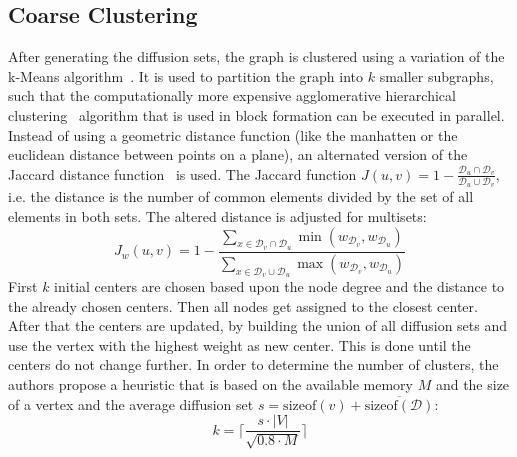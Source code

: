     \subsection{Coarse Clustering}\label{\positionnumber}
    After generating the diffusion sets, the graph is clustered using a variation of the k-Means algorithm~\autocite{lloyd1982least}. 
    It is used to partition the graph into $k$ smaller subgraphs, such that the computationally more expensive agglomerative hierarchical clustering~\autocite{hac} algorithm that is used in block formation can be executed in parallel.
    Instead of using a geometric distance function (like the manhatten or the euclidean distance between points on a plane), an alternated version of the Jaccard distance function~\autocite{jaccard1912distribution} is used. 
    The Jaccard function $J(u, v) = 1 - \frac{\mathcal{D}_u \cap \mathcal{D}_v}{\mathcal{D}_u \cup \mathcal{D}_v}$, i.e. the distance is the number of common elements divided by the set of all elements in both sets. 
    The altered distance is adjusted for multisets:  
    \[J_w (u, v) = 1 - \frac{\sum_{x \in \mathcal{D}_v \cap \mathcal{D}_u} \min (w_{\mathcal{D}_v}, w_{\mathcal{D}_u})}{\sum_{x \in \mathcal{D}_v \cup \mathcal{D}_u} \max (w_{\mathcal{D}_v}, w_{\mathcal{D}_u})} \]
    First $k$ initial centers are chosen based upon the node degree and the distance to the already chosen centers.
    Then all nodes get assigned to the closest center. 
    After that the centers are updated, by building the union of all diffusion sets and use the vertex with the highest weight as new center.
    This is done until the centers do not change further.
    In order to determine the number of clusters, the authors propose a heuristic that is based on the available memory $M$ and the size of a vertex and the average diffusion set $s = \text{sizeof}(v) + \overline{\text{sizeof}(\mathcal{D})}$: 
    \[ k = \lceil \frac{s \cdot |V|}{\sqrt{0.8 \cdot M}} \rceil \]
    
